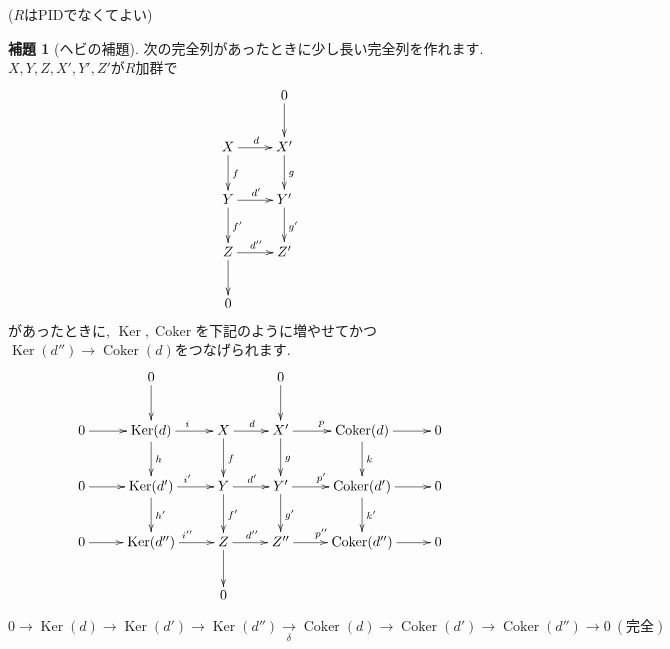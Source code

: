 \documentclass{jsarticle}
\newcommand{\makeop}[1]{\mathop{\mathrm{#1}}\nolimits}
\def\Ker{\makeop{Ker}}
\def\Coker{\makeop{Coker}}
\theoremstyle{definition}
\newtheorem{lemma}{補題}
\numberwithin{theorem}{section}
\begin{document}
($R$はPIDでなくてよい)
\begin{lemma}[ヘビの補題]
次の完全列があったときに少し長い完全列を作れます. $X, Y, Z, X', Y', Z'$が$R$加群で
\begin{equation*}
\xymatrix{
  & 0 \ar[d]\\
  X \ar[r]^d \ar[d]^f & X' \ar[d]^g\\
  Y \ar[r]^{d'} \ar[d]^{f'} & Y' \ar[d]^{g'}\\
  Z \ar[r]^{d''} \ar[d] & Z'\\
  0 & \\
}
\end{equation*}
があったときに, $\Ker, \Coker$を下記のように増やせてかつ$\Ker(d'') \rightarrow \Coker(d)$をつなげられます.
\begin{equation*}
\xymatrix{
  & 0 \ar[d] & & 0 \ar[d] \\
  0 \ar[r] & \Ker(d)   \ar[r]^i     \ar[d]^h    & X \ar[r]^d     \ar[d]^f    & X'  \ar[r]^p    \ar[d]^g    & \Coker(d)  \ar[r] \ar[d]^k    & 0\\
  0 \ar[r] & \Ker(d')  \ar[r]^{i'}  \ar[d]^{h'} & Y \ar[r]^{d'}  \ar[d]^{f'} & Y'  \ar[r]^{p'} \ar[d]^{g'} & \Coker(d') \ar[r] \ar[d]^{k'} & 0\\
  0 \ar[r] & \Ker(d'') \ar[r]^{i''}              & Z \ar[r]^{d''} \ar[d]      & Z'' \ar[r]^{p''}             & \Coker(d'') \ar[r]             & 0\\
            &                                      & 0
}
\end{equation*}

\begin{equation*}
0 \rightarrow \Ker(d) \rightarrow \Ker(d') \rightarrow \Ker(d'') \xrightarrow[\delta]{} \Coker(d) \rightarrow \Coker(d') \rightarrow \Coker(d'') \rightarrow 0\ (完全)
\end{equation*}
\end{lemma}
\end{document}
